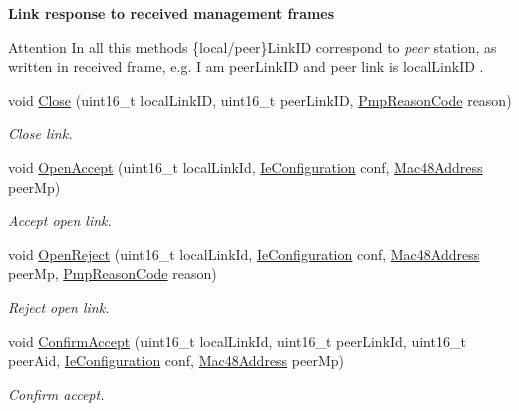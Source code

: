 \begin{Indent}{\bf Link response to received management frames}\par
{\em \begin{DoxyAttention}{Attention}
In all this methods \{local/peer\}Link\+ID correspond to {\itshape peer} station, as written in received frame, e.\+g. I am peer\+Link\+ID and peer link is local\+Link\+ID . 
\end{DoxyAttention}
}\begin{DoxyCompactItemize}
\item 
void \hyperlink{classns3_1_1dot11s_1_1PeerLink_a59ff6efe109654ba276b0832d5679c74}{Close} (uint16\+\_\+t local\+Link\+ID, uint16\+\_\+t peer\+Link\+ID, \hyperlink{group__dot11s_ga1132ec5975c87960ceb86ea54481aba6}{Pmp\+Reason\+Code} reason)
\begin{DoxyCompactList}\small\item\em Close link. \end{DoxyCompactList}\item 
void \hyperlink{classns3_1_1dot11s_1_1PeerLink_a288bbe52d4761c8e41fb35b07dd5d868}{Open\+Accept} (uint16\+\_\+t local\+Link\+Id, \hyperlink{classns3_1_1dot11s_1_1IeConfiguration}{Ie\+Configuration} conf, \hyperlink{classns3_1_1Mac48Address}{Mac48\+Address} peer\+Mp)
\begin{DoxyCompactList}\small\item\em Accept open link. \end{DoxyCompactList}\item 
void \hyperlink{classns3_1_1dot11s_1_1PeerLink_ab26cafb6df6ccdc8407e867f39a685ed}{Open\+Reject} (uint16\+\_\+t local\+Link\+Id, \hyperlink{classns3_1_1dot11s_1_1IeConfiguration}{Ie\+Configuration} conf, \hyperlink{classns3_1_1Mac48Address}{Mac48\+Address} peer\+Mp, \hyperlink{group__dot11s_ga1132ec5975c87960ceb86ea54481aba6}{Pmp\+Reason\+Code} reason)
\begin{DoxyCompactList}\small\item\em Reject open link. \end{DoxyCompactList}\item 
void \hyperlink{classns3_1_1dot11s_1_1PeerLink_ab96b1b9bcf9dfbc1aec1f16bde2055cb}{Confirm\+Accept} (uint16\+\_\+t local\+Link\+Id, uint16\+\_\+t peer\+Link\+Id, uint16\+\_\+t peer\+Aid, \hyperlink{classns3_1_1dot11s_1_1IeConfiguration}{Ie\+Configuration} conf, \hyperlink{classns3_1_1Mac48Address}{Mac48\+Address} peer\+Mp)
\begin{DoxyCompactList}\small\item\em Confirm accept. \end{DoxyCompactList}\item 

\end{DoxyCompactItemize}
\end{Indent}
